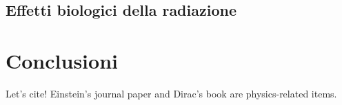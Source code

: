 \documentclass[12pt,a4paper,twoside]{report}
\begin{document}
	
	
	
	
	
	
	
	\section{Effetti biologici della radiazione}
	
	
	
	
	
	
	


	
	
	
	
			
	
	\chapter*{Conclusioni}
		Let's cite! Einstein's journal paper \cite{einstein} and Dirac's book \cite{dirac} are physics-related items.
	\newpage	
	\printbibliography[
		heading=bibintoc,
		title={Bibliografia}
		]
		 	
\end{document}
